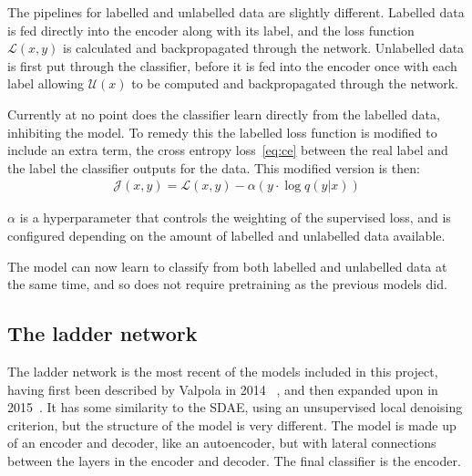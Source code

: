 The pipelines for labelled and unlabelled data are slightly different. Labelled data is fed directly into the encoder
along with its label, and the loss function $\mathcal{L}(x, y)$ is calculated and backpropagated through the network. Unlabelled data is 
first put through the classifier, before it is fed into the encoder once with each label allowing $\mathcal{U}(x)$ to be computed and 
backpropagated through the network.

Currently at no point does the classifier learn directly from the labelled data, inhibiting the model. To remedy
this the labelled loss function is modified to include an extra term, the cross entropy loss~\eqref{eq:ce} between the real label and the 
label the classifier outputs for the data. This modified version is then:
\begin{align}
  \mathcal{J}(x, y) = \mathcal{L}(x, y) - \alpha (y \cdot \log q(y|x))
\end{align}

$\alpha$ is a hyperparameter that controls the weighting of the supervised loss, and is configured depending on the amount of labelled and 
unlabelled data available.

The model can now learn to classify from both labelled and unlabelled data at the same time, and so does not require pretraining as
the previous models did.

\subsection{The ladder network} \label{ladder}

The ladder network is the most recent of the models included in this project, having first been described by Valpola in 2014
~\cite{DBLP:journals/corr/Valpola14}, and then expanded upon in 2015~\cite{DBLP:journals/corr/RasmusVHBR15}. 
It has some similarity to the SDAE, using an unsupervised local denoising criterion, but the structure of the model is very different.
The model is made up of an encoder and decoder, like an autoencoder, but with lateral connections between the layers in the encoder 
and decoder. The final classifier is the encoder.

